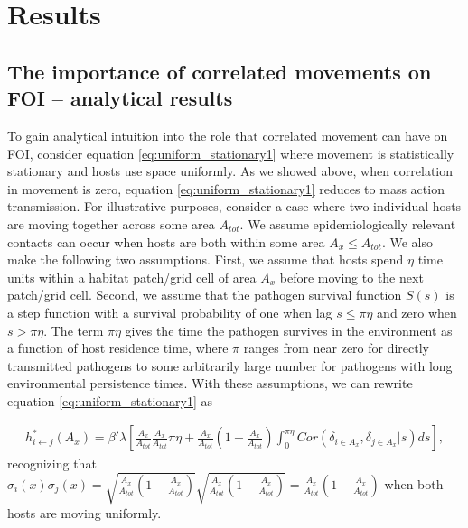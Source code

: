 \documentclass[letterpaper]{article}
\begin{document}
\section*{Results}

\subsection*{The importance of correlated movements on FOI -- analytical results}


To gain analytical intuition into the role that correlated movement can have on FOI, consider equation \ref{eq:uniform_stationary1} where movement is statistically stationary and hosts use space uniformly.  As we showed above, when correlation in movement is zero, equation \ref{eq:uniform_stationary1} reduces to mass action transmission. 
For illustrative purposes, consider a case where two individual hosts are moving together across some area $A_{tot}$. We assume epidemiologically relevant contacts can occur when hosts are both within some area $A_x \leq A_{tot}$. We also make the following two assumptions.  
First, we assume that hosts spend $\eta$ time units within a habitat patch/grid cell of area $A_x$ before moving to the next patch/grid cell. Second, we assume that the pathogen survival function $S(s)$ is a step function with a survival probability of one when lag $s \leq \pi \eta$ and zero when $s > \pi \eta$.  
The term $\pi \eta$ gives the time the pathogen survives in the environment as a function of host residence time, where $\pi$ ranges from near zero for directly transmitted pathogens to some arbitrarily large number for pathogens with long environmental persistence times.  With these assumptions, we can rewrite equation \ref {eq:uniform_stationary1} as 

\begin{equation}
    \begin{aligned}
        h^*_{i \leftarrow j}(A_x) = \beta' \lambda \left[\frac{A_x}{A_{tot}}\frac{A_x}{A_{tot}} \pi \eta + \frac{A_x}{A_{tot}}(1 - \frac{A_x}{A_{tot}}) \int_{0}^{\pi \eta} Cor(\delta_{i \in A_x}, \delta_{j \in A_x} | s) ds\right],
    \end{aligned}
    \label{eq:uniform_stationary2}
\end{equation}
recognizing that $\sigma_i(x) \sigma_j(x) = \sqrt{\frac{A_x}{A_{tot}}(1 - \frac{A_x}{A_{tot}})}\sqrt{\frac{A_x}{A_{tot}}(1 - \frac{A_x}{A_{tot}})} = \frac{A_x}{A_{tot}}(1 - \frac{A_x}{A_{tot}})$ when both hosts are moving uniformly.
\end{document}
